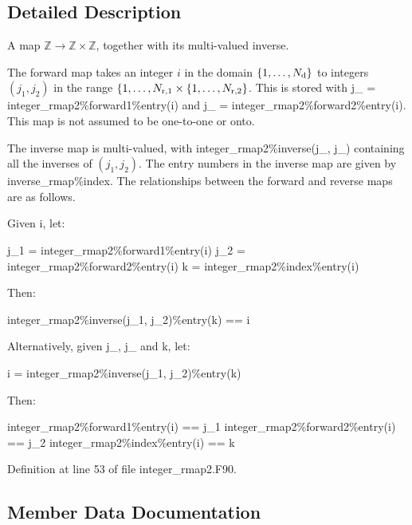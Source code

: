 \subsection{Detailed Description}
A map $\mathbb{Z} \to \mathbb{Z} \times \mathbb{Z}$, together with its multi-\/valued inverse. 

The forward map takes an integer $i$ in the domain $\{1, \ldots, N_{\rm d}\}$ to integers $(j_1,j_2)$ in the range $\{1, \ldots, N_{\rm r,1} \times \{1, \ldots, N_{\rm r,2}\}$. This is stored with {\ttfamily j\+\_ = integer\+\_\+rmap2\%forward1\%entry(i)} and {\ttfamily j\+\_ = integer\+\_\+rmap2\%forward2\%entry(i)}. This map is not assumed to be one-\/to-\/one or onto.

The inverse map is multi-\/valued, with {\ttfamily integer\+\_\+rmap2\%inverse(j\+\_, j\+\_)} containing all the inverses of $(j_1, j_2)$. The entry numbers in the inverse map are given by {\ttfamily inverse\+\_\+rmap\%index}. The relationships between the forward and reverse maps are as follows.

Given {\ttfamily i}, let\+: 
\begin{DoxyPre}
 j\_1 = integer\_rmap2\%forward1\%entry(i)
 j\_2 = integer\_rmap2\%forward2\%entry(i)
 k = integer\_rmap2\%index\%entry(i)
 \end{DoxyPre}
 Then\+: 
\begin{DoxyPre}
 integer\_rmap2\%inverse(j\_1, j\_2)\%entry(k) == i
 \end{DoxyPre}


Alternatively, given {\ttfamily j\+\_}, {\ttfamily j\+\_} and {\ttfamily k}, let\+: 
\begin{DoxyPre}
 i = integer\_rmap2\%inverse(j\_1, j\_2)\%entry(k)
 \end{DoxyPre}
 Then\+: 
\begin{DoxyPre}
 integer\_rmap2\%forward1\%entry(i) == j\_1
 integer\_rmap2\%forward2\%entry(i) == j\_2
 integer\_rmap2\%index\%entry(i) == k
 \end{DoxyPre}
 

Definition at line 53 of file integer\+\_\+rmap2.\+F90.



\subsection{Member Data Documentation}
\mbox{\label{structpmc__integer__rmap2_1_1integer__rmap2__t_af38ad1ec8549c4893f2a4b66835d476b}} 

